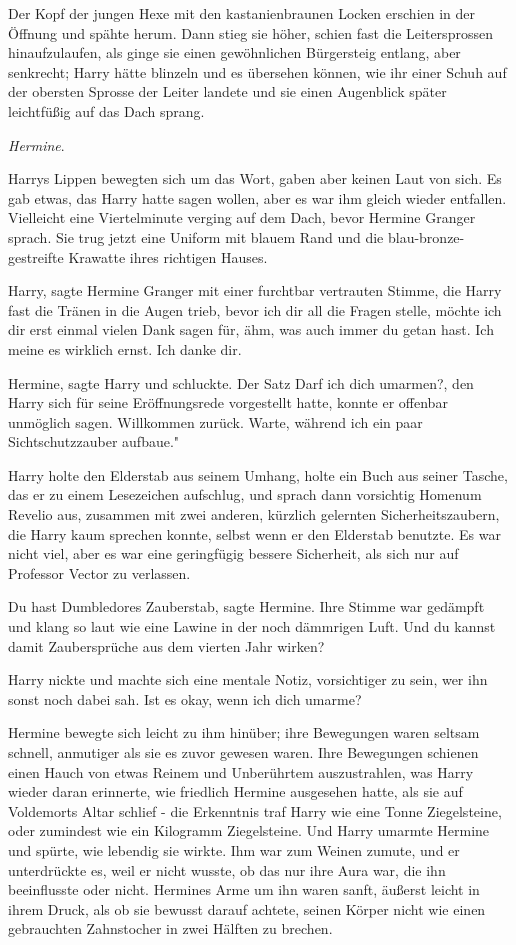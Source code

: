 Der Kopf der jungen Hexe mit den kastanienbraunen Locken erschien in der Öffnung
und spähte herum. Dann stieg sie höher, schien fast die Leitersprossen
hinaufzulaufen, als ginge sie einen gewöhnlichen Bürgersteig entlang, aber
senkrecht; Harry hätte blinzeln und es übersehen können, wie ihr einer Schuh auf
der obersten Sprosse der Leiter landete und sie einen Augenblick später
leichtfüßig auf das Dach sprang.

\emph{Hermine}.

Harrys Lippen bewegten sich um das Wort, gaben aber keinen Laut von sich. Es gab
etwas, das Harry hatte sagen wollen, aber es war ihm gleich wieder entfallen.
Vielleicht eine Viertelminute verging auf dem Dach, bevor Hermine Granger
sprach. Sie trug jetzt eine Uniform mit blauem Rand und die
blau-bronze-gestreifte Krawatte ihres richtigen Hauses.

\glqq{}Harry\grqq{}, sagte Hermine Granger mit einer furchtbar vertrauten Stimme,
die Harry fast die Tränen in die Augen trieb, \glqq{}bevor ich dir all die Fragen
stelle, möchte ich dir erst einmal vielen Dank sagen für, ähm, was auch immer du
getan hast. Ich meine es wirklich ernst. Ich danke dir.\grqq{}

\glqq{}Hermine\grqq{}, sagte Harry und schluckte. Der Satz \glqq{}Darf ich dich
umarmen?\grqq{}, den Harry sich für seine Eröffnungsrede vorgestellt hatte,
konnte er offenbar unmöglich sagen. \glqq{}Willkommen zurück. Warte, während ich
ein paar Sichtschutzzauber aufbaue."

Harry holte den Elderstab aus seinem Umhang, holte ein Buch aus seiner Tasche,
das er zu einem Lesezeichen aufschlug, und sprach dann vorsichtig \glqq{}Homenum
Revelio\grqq{} aus, zusammen mit zwei anderen, kürzlich gelernten
Sicherheitszaubern, die Harry kaum sprechen konnte, selbst wenn er den Elderstab
benutzte. Es war nicht viel, aber es war eine geringfügig bessere Sicherheit,
als sich nur auf Professor Vector zu verlassen.

\glqq{}Du hast Dumbledores Zauberstab\grqq{}, sagte Hermine. Ihre Stimme war
gedämpft und klang so laut wie eine Lawine in der noch dämmrigen Luft. \glqq{}Und
du kannst damit Zaubersprüche aus dem vierten Jahr wirken?\grqq{}

Harry nickte und machte sich eine mentale Notiz, vorsichtiger zu sein, wer ihn
sonst noch dabei sah. \glqq{}Ist es okay, wenn ich dich umarme?\grqq{}

Hermine bewegte sich leicht zu ihm hinüber; ihre Bewegungen waren seltsam
schnell, anmutiger als sie es zuvor gewesen waren. Ihre Bewegungen schienen
einen Hauch von etwas Reinem und Unberührtem auszustrahlen, was Harry wieder
daran erinnerte, wie friedlich Hermine ausgesehen hatte, als sie auf Voldemorts
Altar schlief - die Erkenntnis traf Harry wie eine Tonne Ziegelsteine, oder
zumindest wie ein Kilogramm Ziegelsteine. Und Harry umarmte Hermine und spürte,
wie lebendig sie wirkte. Ihm war zum Weinen zumute, und er unterdrückte es, weil
er nicht wusste, ob das nur ihre Aura war, die ihn beeinflusste oder nicht.
Hermines Arme um ihn waren sanft, äußerst leicht in ihrem Druck, als ob sie
bewusst darauf achtete, seinen Körper nicht wie einen gebrauchten Zahnstocher in
zwei Hälften zu brechen.

